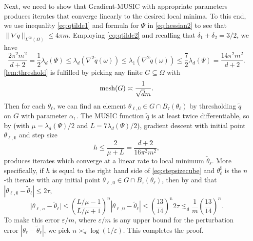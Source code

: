 \documentclass[11pt]{article}
\theoremstyle{definition}
\numberwithin{theorem}{section}
\numberwithin{lemma}{section}
\numberwithin{equation}{section}
\renewcommand{\subset}{\subseteq}
\renewcommand{\tilde}{\widetilde}
\renewcommand{\epsilon}{\varepsilon}
\newcommand{\mesh}{{\rm mesh}}
\newcommand{\domain}{\Omega}
\newcommand{\round}[1]{{\left(#1\right)}}
\numberwithin{equation}{section}
\begin{document}
	Next, we need to show that Gradient-MUSIC with appropriate parameters produces iterates that converge linearly to the desired local minima. To this end, we use inequality \eqref{eq:qtilde1} and formula for $\Psi$ in \eqref{eq:hessian2} to see that $\|\nabla \tilde q\|_{L^\infty(\Omega)}\leq 4\pi m$. Employing \eqref{eq:qtilde2} and recalling that $\delta_1+\delta_2=3/2$, we have
	\begin{equation} \label{eq:convexityball}
		\frac{2\pi^2m^2}{d+2} 
		= \frac 12 \lambda_d(\Psi)
		\leq \lambda_d \round{\nabla^2 \tilde q(\omega)}
		\leq \lambda_1 \round{\nabla^2 \tilde q(\omega)} 
		\leq \frac 72 \lambda_d(\Psi) 
		= \frac{14\pi^2 m^2}{d+2}. 
	\end{equation}
	\cref{lem:threshold} is fulfilled by picking any finite $G\subset \domain$ with 
	\begin{equation}\label{eq:meshball}
		\mesh(G)
		\asymp \frac 1{ \sqrt d m}.
	\end{equation}
	Then for each $\theta_\ell$, we can find an element $\theta_{\ell,0}\in G\cap B_\tau(\theta_\ell)$ by thresholding $\tilde q$ on $G$ with parameter $\alpha_1$. The MUSIC function $\tilde q$ is at least twice differentiable, so by \cite[Theorem 2.1.15]{nesterov2018lectures} (with $\mu=\lambda_d(\Psi)/2$ and $L=7\lambda_d(\Psi)/2$), gradient descent with initial point $\theta_{\ell,0}$ and step size
	\begin{equation}
		\label{eq:stepsizeball}
		h
		\leq \frac 2{\mu+L}
		= \frac{d+2}{16\pi^2 m^2},
	\end{equation} 
	produces iterates which converge at a linear rate to local minimum $\tilde\theta_\ell$. More specifically, if $h$ is equal to the right hand side of \eqref{eq:stepsizecube} and $\theta_\ell^\sharp$ is the $n$-th iterate with any initial point $\theta_{\ell,0}\in G\cap B_\tau(\theta_\ell)$, then by \cite[Theorem 2.1.15]{nesterov2018lectures} and that $|\theta_{\ell,0}-\tilde \theta_\ell|\leq 2\tau$,
	\begin{equation}
		\label{eq:numericalerrorball}
		\big|\theta_{\ell,n}-\tilde \theta_\ell\big|
		\leq \left(\frac{L/\mu-1}{L/\mu+1}\right)^n |\theta_{\ell,0}-\tilde \theta_\ell| 
		\leq \left(\frac{13}{14}\right)^n 2\tau
		\lesssim_d \frac 1 m \left(\frac{13}{14}\right)^n.
	\end{equation}
	To make this error $\epsilon/m$, where $\epsilon/m$ is any upper bound for the perturbation error $|\theta_\ell-\tilde\theta_\ell|$, we pick $n\asymp_d \log(1/\epsilon)$. This completes the proof.
\end{document}
